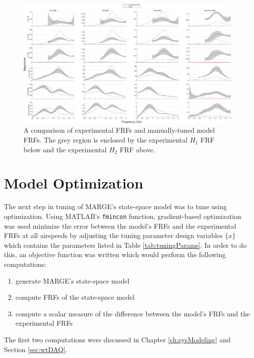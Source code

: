 \begin{landscape}

\begin{figure}[H]
	\centering
	\label{fig:manualTunedFRF}
	\includegraphics[width=9in]{figs/FRFcompare_manualTune_q207.png}
	\caption{A comparison of experimental FRFs and manually-tuned model FRFs. The grey region is enclosed by the experimental $H_1$ FRF below and the experimental $H_2$ FRF above.}
\end{figure}

\end{landscape}

\section{Model Optimization} %

The next step in tuning of MARGE's state-space model was to tune using optimization. Using MATLAB's \verb|fmincon| function, gradient-based optimization was used minimize the error between the model's FRFs and the experimental FRFs at all airspeeds by adjusting the tuning parameter design variables $\{x\}$ which contains the parameters listed in Table \ref{tab:tuningParams}. In order to do this, an objective function was written which would perform the following computations:
\begin{enumerate}
	\item generate MARGE's state-space model
	\item compute FRFs of the state-space model
	\item compute a scalar measure of the difference between the model's FRFs and the experimental FRFs
\end{enumerate}
The first two computations were discussed in Chapter \ref{ch:sysModeling} and Section \ref{sec:wtDAQ}.

